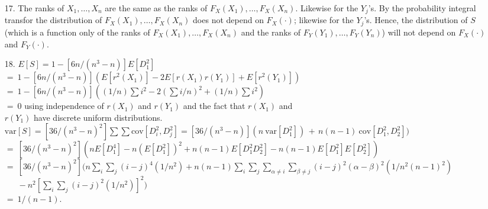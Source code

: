 \begin{enumerate}
	\item[17.] The ranks of $X_1, \ldots, X_n$ are the same as the ranks of $F_X(X_1), \ldots, F_X(X_n)$. Likewise for the $Y_j$'s. By the probability integral transfor the distribution of $F_X(X_1), \ldots, F_X(X_n)$ does not depend on $F_X(\cdot)$; likewise for the $Y_j$'s. Hence, the distribution of $S$ (which is a function only of the ranks of $F_X(X_1), \ldots, F_X(X_n)$ and the ranks of $F_Y(Y_1), \ldots, F_Y(Y_n)$) will not depend on $F_X(\cdot)$ and $F_Y(\cdot)$.
	
	\item[18.] $E[S] = 1 - [6n/(n^3-n)]E[D_1^2]$ \\
	$=\ 1 - [6n/(n^3-n)](E[r^2(X_1)] - 2E[r(X_1)r(Y_1)] + E[r^2(Y_1)])$ \\
	$=\ 1 - [6n/(n^3-n)]((1/n)\sum i^2 - 2(\sum i/n)^2 + (1/n)\sum i^2)$ \\
	$=\ 0$ using independence of $r(X_1)$ and $r(Y_1)$ and the fact that  $r(X_1)$ and \\ 
	\phantom{$=\ 0$}$r(Y_1)$ have discrete uniform distributions. \\
	$\mbox{var}[S] = [36/(n^3-n)^2]\sum\sum \mbox{cov}[D_i^2,D_j^2] = [36/(n^3-n)](n\ \mbox{var}[D_1^2]) \,+\, n(n-1)\ \mbox{cov}[D_1^2,D_2^2])$ \\
	$=\ [36/(n^3-n)^2](nE[D_1^4] -n(E[D_1^2])^2 +n(n-1)E[D_1^2D_2^2] -n(n-1)E[D_1^2]E[D_2^2])$ \\
	$=\ [36/(n^3-n)^2](n\sum\limits_{i}\sum\limits_{j}(i-j)^4(1/n^2) + n(n-1)\sum\limits_{i}\sum\limits_{j}\sum\limits_{\alpha\ne i}\sum\limits_{\beta\ne j}(i-j)^2(\alpha-\beta)^2(1/n^2(n-1)^2)$ \\
	$\phantom{=\ } - n^2[\sum\limits_{i}\sum\limits_{j}(i-j)^2(1/n^2)]^2)$ \\
	$=\ 1/(n-1)$. 
	
\end{enumerate}